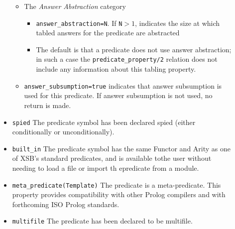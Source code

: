 \begin{description}
\begin{itemize}
\begin{itemize}
\begin{itemize}
\end{itemize}
\item The {\em Answer Abstraction} category
\begin{itemize}
\item{\tt answer\_abstraction=N}.  If {\tt N}$>1$, indicates the size at
  which tabled answers for the predicate are abstracted
%
\item The default is that a predicate does not use answer
  abstraction; in such a case the {\tt predicate\_property/2} relation
  does not include any information about this tabling property.
\end{itemize}
\item {\tt answer\_subsumption=true} indicates that answer subsumption
  is used for this predicate.  If answer subsumption is not used, no
  return is made.
\end{itemize}
%
\item{\tt spied} The predicate symbol has been declared spied (either
  conditionally or unconditionally).
%
%
\item{\tt built\_in} The predicate symbol has the same
  Functor and Arity as one of XSB's standard predicates, and is
  available tothe user without needing to load a file or import
 th epredicate from a module. 
%
%
\item{\tt meta\_predicate(Template)}  The
  predicate is a meta-predicate. This property provides
  compatibility with other Prolog compilers and with forthcoming
  ISO Prolog standards. 
%
\item{\tt multifile} The predicate has been declared to be multifile.
\end{itemize}


\end{description}
